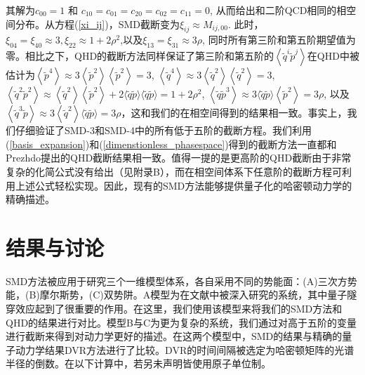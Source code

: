 其解为$c_{00} = 1$ 和 $c_{10}=c_{01}=c_{20}=c_{02}=c_{11}=0$, 从而给出和二阶QCD相同的相空间分布。从方程(\ref{xi_ij})，SMD截断变为$\xi_{i j} \approx M_{i j, 00}$. 此时，$\xi_{04}=\xi_{40} \approx 3, \xi_{22} \approx 1+2 \rho^{2}$,以及$\xi_{13}=\xi_{31} \approx 3 \rho$, 同时所有第三阶和第五阶期望值为零。相比之下，QHD的截断方法同样保证了第三阶和第五阶的$\left\langle\tilde{q}^{i} \tilde{p}^{j}\right\rangle$在QHD中被估计为$\left\langle\tilde{p}^{4}\right\rangle \approx 3\left\langle\tilde{p}^{2}\right\rangle\left\langle\tilde{p}^{2}\right\rangle= 3$, $\left\langle\tilde{q}^{4}\right\rangle \approx 3\left\langle\tilde{q}^{2}\right\rangle\left\langle\tilde{q}^{2}\right\rangle= 3$, $\left\langle\tilde{q}^{2} \tilde{p}^{2}\right\rangle \approx\left\langle\tilde{q}^{2}\right\rangle\left\langle\tilde{p}^{2}\right\rangle+ 2\langle\tilde{q} \tilde{p}\rangle\langle\tilde{q} \tilde{p}\rangle= 1+2 \rho^{2}$, $\left\langle\tilde{q} \tilde{p}^{3}\right\rangle \approx 3\langle\tilde{q} \tilde{p}\rangle\left\langle\tilde{p}^{2}\right\rangle = 3 \rho$, 以及$\left\langle\tilde{q}^{3} \tilde{p}\right\rangle \approx 3\left\langle\tilde{q}^{2}\right\rangle\langle\tilde{q} \tilde{p}\rangle= 3 \rho$，这和我们的在相空间得到的结果相一致。事实上，我们仔细验证了SMD-3和SMD-4中的所有低于五阶的截断方程。我们利用(\ref{basis_expansion})和(\ref{dimenstionless_phasespace})得到的截断方法一直都和Prezhdo提出的QHD截断结果相一致。值得一提的是更高阶的QHD截断由于非常复杂的化简公式没有给出（见附录B），而在相空间体系下任意阶的截断方程可利用上述公式轻松实现。因此，现有的SMD方法能够提供量子化的哈密顿动力学的精确描述。

\section{结果与讨论}
SMD方法被应用于研究三个一维模型体系，各自采用不同的势能面：(A)三次方势能，(B)摩尔斯势，(C)双势阱。A模型为在文献中被深入研究的系统，其中量子隧穿效应起到了很重要的作用。在这里，我们使用该模型来将我们的SMD方法和QHD的结果进行对比。模型B与C为更为复杂的系统，我们通过对高于五阶的变量进行截断来得到对动力学更好的描述。在这两个模型中，SMD的结果与精确的量子动力学结果DVR方法进行了比较。DVR的时间间隔被选定为哈密顿矩阵的光谱半径的倒数。在以下计算中，若另未声明皆使用原子单位制。

